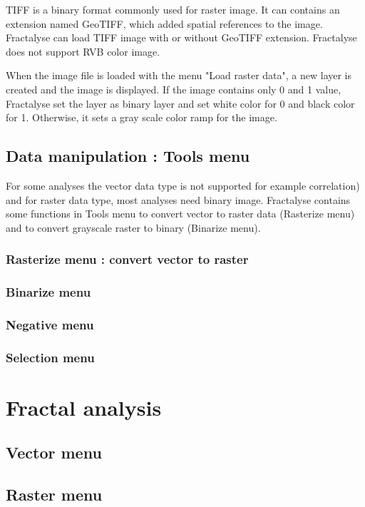 \documentclass[a4paper,10pt]{report}
\begin{document}
TIFF is a binary format commonly used for raster image. It can contains an extension named GeoTIFF, which added spatial references to the image. Fractalyse can load TIFF image with or without GeoTIFF extension. Fractalyse does not support RVB color image.

When the image file is loaded with the menu "Load raster data", a new layer is created and the image is displayed. If the image contains only 0 and 1 value, Fractalyse set the layer as binary layer and set white color for 0 and black color for 1. Otherwise, it sets a gray scale color ramp for the image.


\section{Data manipulation : Tools menu}
For some analyses the vector data type is not supported for example correlation) and for raster data type, most analyses need binary image. Fractalyse contains some functions in Tools menu to convert vector to raster data (Rasterize menu) and to convert grayscale raster to binary (Binarize menu).
\subsection{Rasterize menu : convert vector to raster}

\subsection{Binarize menu}
\subsection{Negative menu}
\subsection{Selection menu}

\chapter{Fractal analysis}
\section{Vector menu}

\section{Raster menu}
\end{document}
